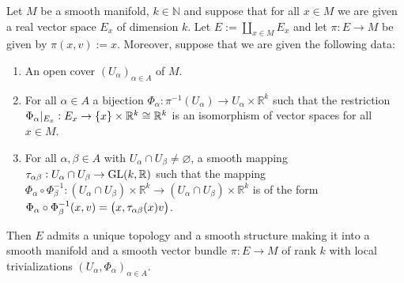 \begin{lemma}
	\label{lem:vector_bundle_chart_lemma}
	Let $M$ be a smooth manifold, $k \in \mathbb{N}$ and suppose that for all $x \in M$ we are given a real vector space $E_x$ of dimension $k$. Let $E := \coprod_{x \in M} E_x$ and let $\pi : E \to M$ be given by $\pi(x,v) := x$. Moreover, suppose that we are given the following data:
	\begin{enumerate}[label = \textup{(\roman*)},leftmargin=*]
		\item An open cover $(U_\alpha)_{\alpha \in A}$ of $M$.
		\item For all $\alpha \in A$ a bijection $\Phi_\alpha : \pi^{-1}(U_\alpha) \to U_\alpha \times \mathbb{R}^k$ such that the restriction $\Phi_\alpha\vert_{E_x} : E_x \to \cbr{x} \times \mathbb{R}^k \cong \mathbb{R}^k$ is an isomorphism of vector spaces for all $x \in M$.
		\item For all $\alpha, \beta \in A$ with $U_\alpha \cap U_\beta \neq \varnothing$, a smooth mapping $\tau_{\alpha\beta} : U_\alpha \cap U_\beta \to \operatorname{GL}(k,\mathbb{R})$  such that the mapping $\Phi_\alpha \circ \Phi_\beta^{-1} : (U_\alpha \cap U_\beta) \times \mathbb{R}^k \to (U_\alpha \cap U_\beta) \times \mathbb{R}^k$ is of the form $\Phi_\alpha \circ \Phi_\beta^{-1}(x,v) = \del[1]{x,\tau_{\alpha\beta}(x)v}$. 
	\end{enumerate}
	Then $E$ admits a unique topology and a smooth structure making it into a smooth manifold and a smooth vector bundle $\pi : E \to M$ of rank $k$ with local trivializations $(U_\alpha,\Phi_\alpha)_{\alpha \in A}$.
\end{lemma}

